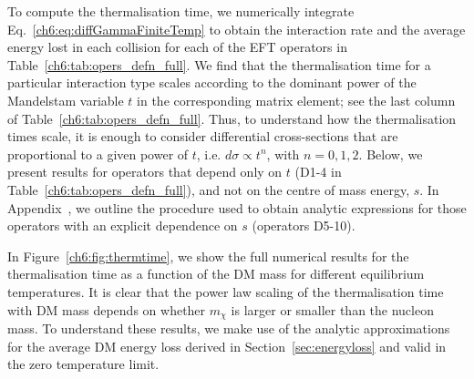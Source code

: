 To compute the thermalisation time, we numerically integrate Eq.~\ref{ch6:eq:diffGammaFiniteTemp} to obtain the interaction rate and the average energy lost in each collision for each of the EFT operators in Table~\ref{ch6:tab:opers_defn_full}. We find that the thermalisation time for a particular interaction type scales according to the dominant power of the Mandelstam variable $t$ in the corresponding matrix element; see the last column of  Table~\ref{ch6:tab:opers_defn_full}. Thus, to understand how the thermalisation times scale, it is enough to consider differential cross-sections that are proportional to a given power of $t$, i.e. $d\sigma\propto t^n$, with $n=0,1,2$. 
Below, we present results for operators that depend only on $t$ (D1-4 in Table~\ref{ch6:tab:opers_defn_full}), and not on the centre of mass energy, $s$. In Appendix~, we outline the procedure used to obtain analytic expressions for those operators with an explicit dependence on $s$ (operators D5-10). 


In Figure~\ref{ch6:fig:thermtime}, we show the full numerical results for the thermalisation time as a function of the DM mass for different equilibrium temperatures. It is clear that the power law scaling of the thermalisation time with DM mass depends on whether $m_\chi$ is larger or smaller than the nucleon mass. To understand these results, we make use of the analytic approximations for the average DM energy loss derived in Section~\ref{sec:energyloss} and valid in the zero temperature limit. 

